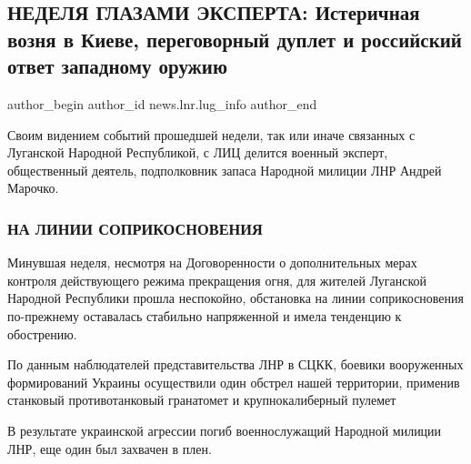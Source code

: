  
 
 
 
 
 
\subsection{НЕДЕЛЯ ГЛАЗАМИ ЭКСПЕРТА: Истеричная возня в Киеве, переговорный дуплет и российский ответ западному оружию}
\label{sec:30_01_2022.stz.news.lnr.lug_info.1.nedelja_glazami_eksperta_marochko}
 
\ifcmt
 author_begin
   author_id news.lnr.lug_info
 author_end
\fi

\begin{zznagolos}
Своим видением событий прошедшей недели, так или иначе связанных с Луганской
Народной Республикой, с ЛИЦ делится военный эксперт, общественный деятель,
подполковник запаса Народной милиции ЛНР Андрей Марочко.
\end{zznagolos}

\subsubsection{НА ЛИНИИ СОПРИКОСНОВЕНИЯ}

Минувшая неделя, несмотря на Договоренности о дополнительных мерах контроля
действующего режима прекращения огня, для жителей Луганской Народной Республики
прошла неспокойно, обстановка на линии соприкосновения по-прежнему оставалась
стабильно напряженной и имела тенденцию к обострению.


По данным наблюдателей представительства ЛНР в СЦКК, боевики вооруженных
формирований Украины осуществили один обстрел нашей территории, применив
станковый противотанковый гранатомет и крупнокалиберный пулемет

В результате украинской агрессии погиб военнослужащий Народной милиции ЛНР, еще
один был захвачен в плен.

